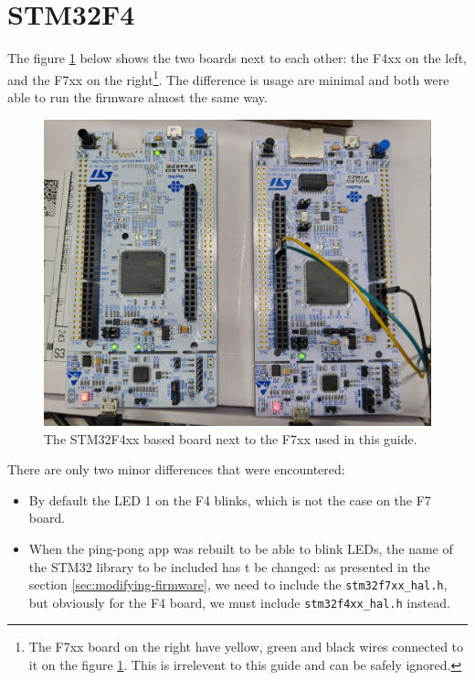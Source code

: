 \documentclass[10pt]{article}
\begin{document}
\pagebreak

\section{STM32F4}
\label{appendix:stm32f4}
The figure \ref{fig:f4} below shows the two boards next to each other: the F4xx on the left, and the F7xx on the right\footnote{The F7xx board on the right have yellow, green and black wires connected to it on the figure \ref{fig:f4}. This is irrelevent to this guide and can be safely ignored.}. The difference is usage are minimal and both were able to run the firmware almost the same way.

\begin{figure}[H]
  \centering
  \includegraphics[width=.8\textwidth]{./img/f4.jpg}
  \caption{The STM32F4xx based board next to the F7xx used in this guide.}
  \label{fig:f4}
\end{figure}

There are only two minor differences that were encountered:
\begin{itemize}
\item By default the LED 1 on the F4 blinks, which is not the case on the F7 board.
\item When the ping-pong app was rebuilt to be able to blink LEDs, the name of the STM32 library to be included has t be changed: as presented in the section \ref{sec:modifying-firmware}, we need to include the \verb|stm32f7xx_hal.h|, but obviously for the F4 board, we must include \verb|stm32f4xx_hal.h| instead.
\end{itemize}
\end{document}
